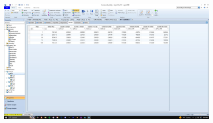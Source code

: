 \documentclass{article}
\begin{document}
\begin{figure}[H]
    \centering
    \includegraphics[width=0.99\textwidth, frame]{img/16 (generic + propset2).JPG}
\end{figure}
\end{document}
